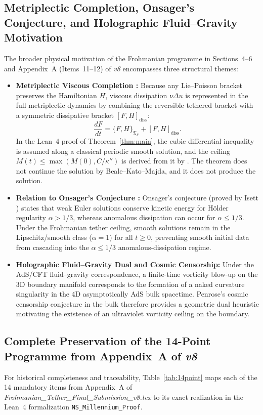 \documentclass[11pt,a4paper]{article}
\theoremstyle{plain}
\theoremstyle{definition}
\theoremstyle{remark}
\newcommand{\Tf}{\mathfrak{T}_F}
\begin{document}
\subsection{Metriplectic Completion, Onsager's Conjecture, and Holographic Fluid--Gravity Motivation}
The broader physical motivation of the Frohmanian programme in Sections~4--6 and Appendix~A (Items~11--12) of \emph{v8} encompasses three structural themes:
\begin{itemize}
\item \textbf{Metriplectic Viscous Completion \cite{Morrison1986}:} Because any Lie--Poisson bracket preserves the Hamiltonian $H$, viscous dissipation $\nu\Delta u$ is represented in the full metriplectic dynamics by combining the reversible tethered bracket with a symmetric dissipative bracket $[F,H]_{\mathrm{diss}}$:
\[
\frac{dF}{dt} = \{F,H\}_{\Tf} + [F,H]_{\mathrm{diss}}.
\]
In the Lean~4 proof of Theorem~\ref{thm:main}, the cubic differential inequality is assumed along a classical periodic smooth solution, and the ceiling $M(t)\le\max(M(0),C/\kappa'')$ is derived from it by . The theorem does not continue the solution by Beale--Kato--Majda, and it does not produce the solution.
\item \textbf{Relation to Onsager's Conjecture \cite{Isett2018}:} Onsager's conjecture (proved by Isett \cite{Isett2018}) states that weak Euler solutions conserve kinetic energy for Hölder regularity $\alpha>1/3$, whereas anomalous dissipation can occur for $\alpha\le1/3$. Under the Frohmanian tether ceiling, smooth solutions remain in the Lipschitz/smooth class ($\alpha=1$) for all $t\ge0$, preventing smooth initial data from cascading into the $\alpha\le1/3$ anomalous-dissipation regime.
\item \textbf{Holographic Fluid--Gravity Dual and Cosmic Censorship:} Under the AdS/CFT fluid--gravity correspondence, a finite-time vorticity blow-up on the 3D boundary manifold corresponds to the formation of a naked curvature singularity in the 4D asymptotically AdS bulk spacetime. Penrose's cosmic censorship conjecture in the bulk therefore provides a geometric dual heuristic motivating the existence of an ultraviolet vorticity ceiling on the boundary.
\end{itemize}

\subsection{Complete Preservation of the 14-Point Programme from Appendix~A of \emph{v8}}
For historical completeness and traceability, Table~\ref{tab:14point} maps each of the 14 mandatory items from Appendix~A of \emph{Frohmanian\_Tether\_Final\_Submission\_v8.tex} to its exact realization in the Lean~4 formalization \texttt{NS\_Millennium\_Proof}.
\end{document}
